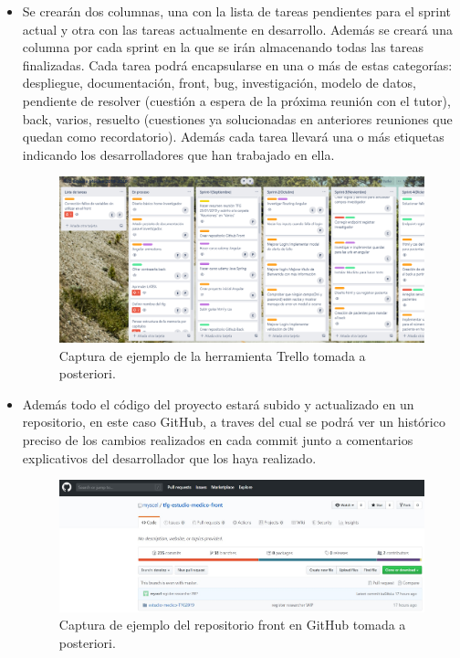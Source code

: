    \begin{itemize}
    \item Se crearán dos columnas, una con la lista de tareas pendientes para el sprint actual y otra con las tareas actualmente en desarrollo. Además se creará una columna por cada sprint en la que se irán almacenando todas las tareas finalizadas. Cada tarea podrá encapsularse en una o más de estas categorías: despliegue, documentación, front, bug, investigación, modelo de datos, pendiente de resolver (cuestión a espera de la próxima reunión con el tutor), back, varios, resuelto (cuestiones ya solucionadas en anteriores reuniones que quedan como recordatorio). Además cada tarea llevará una o más etiquetas indicando los desarrolladores que han trabajado en ella.\newline
    
     \begin{figure}[h]
    \centering
     \includegraphics[width=1\textwidth]{images/Trello.jpg}
    \caption{Captura de ejemplo de la herramienta Trello tomada a posteriori.}
    \end{figure}
    \newpage
    
    \item  Además todo el código del proyecto estará subido y actualizado en un repositorio, en este caso GitHub, a traves del cual se podrá ver un histórico preciso de los cambios realizados en cada commit junto a comentarios explicativos del desarrollador que los haya realizado.\newline
    
    \begin{figure}[h]
    \centering
     \includegraphics[width=1\textwidth]{images/GitHubFront.jpg}
    \caption{Captura de ejemplo del repositorio front en GitHub tomada a posteriori.}
    \end{figure}
    \end{itemize}
    
